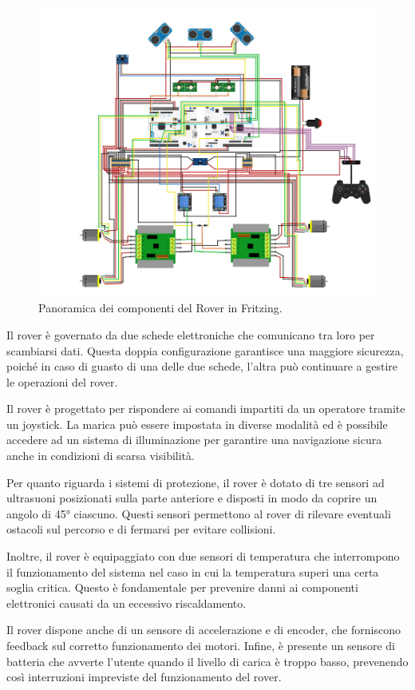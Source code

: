 \documentclass{article}
\begin{document}
\begin{figure}[H]
\centering
\includegraphics[width=0.85\linewidth]{image/friz.png}
\caption{\label{fig:friz}Panoramica dei componenti del Rover in Fritzing.}
\end{figure}
Il rover è governato da due schede elettroniche che comunicano tra loro per scambiarsi dati. Questa doppia configurazione garantisce una maggiore sicurezza, poiché in caso di guasto di una delle due schede, l'altra può continuare a gestire le operazioni del rover.

Il rover è progettato per rispondere ai comandi impartiti da un operatore tramite un joystick. La marica  può essere impostata in diverse modalità ed è possibile accedere ad un sistema di illuminazione per garantire una navigazione sicura anche in condizioni di scarsa visibilità.

Per quanto riguarda i sistemi di protezione, il rover è dotato di tre sensori ad ultrasuoni posizionati sulla parte anteriore e disposti in modo da coprire un angolo di 45° ciascuno. Questi sensori permettono al rover di rilevare eventuali ostacoli sul percorso e di fermarsi per evitare collisioni.

Inoltre, il rover è equipaggiato con due sensori di temperatura che interrompono il funzionamento del sistema nel caso in cui la temperatura superi una certa soglia critica. Questo è fondamentale per prevenire danni ai componenti elettronici causati da un eccessivo riscaldamento.

Il rover dispone anche di un sensore di accelerazione e di encoder, che forniscono feedback sul corretto funzionamento dei motori. Infine, è presente un sensore di batteria che avverte l'utente quando il livello di carica è troppo basso, prevenendo così interruzioni impreviste del funzionamento del rover.
\end{document}
